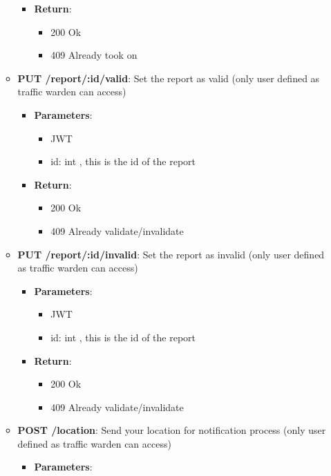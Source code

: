 \documentclass{article}
\begin{document}
\begin{itemize}
\begin{itemize}
\begin{itemize}
\begin{itemize}
						\end{itemize}
					\item \textbf{Return}:
						\begin{itemize}
							\item 200 Ok
							\item 409 Already took on
						\end{itemize}
				\end{itemize}
			\item \textbf{PUT /report/:id/valid}:
				Set the report as valid (only user defined as traffic warden can access)
				\begin{itemize}
					\item \textbf{Parameters}:
						\begin{itemize}
							\item JWT
							\item id: int , this is the id of the report
						\end{itemize}
					\item \textbf{Return}:
						\begin{itemize}
							\item 200 Ok
							\item 409 Already validate/invalidate
						\end{itemize}
				\end{itemize}
			\item \textbf{PUT /report/:id/invalid}:
				Set the report as invalid (only user defined as traffic warden can access)
				\begin{itemize}
					\item \textbf{Parameters}:
						\begin{itemize}
							\item JWT
							\item id: int , this is the id of the report
						\end{itemize}
					\item \textbf{Return}:
						\begin{itemize}
							\item 200 Ok
							\item 409 Already validate/invalidate
						\end{itemize}
				\end{itemize}
			\item \textbf{POST /location}:
				Send your location for notification process (only user defined as traffic warden can access)
				\begin{itemize}
					\item \textbf{Parameters}:

\end{itemize}
\end{itemize}
\end{itemize}
\end{document}
